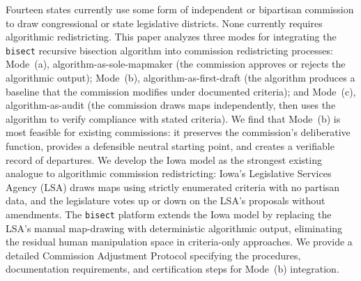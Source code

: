 Fourteen states currently use some form of independent or bipartisan commission to draw congressional or state legislative districts. None currently requires algorithmic redistricting. This paper analyzes three modes for integrating the \texttt{bisect} recursive bisection algorithm into commission redistricting processes: Mode~(a), algorithm-as-sole-mapmaker (the commission approves or rejects the algorithmic output); Mode~(b), algorithm-as-first-draft (the algorithm produces a baseline that the commission modifies under documented criteria); and Mode~(c), algorithm-as-audit (the commission draws maps independently, then uses the algorithm to verify compliance with stated criteria). We find that Mode~(b) is most feasible for existing commissions: it preserves the commission's deliberative function, provides a defensible neutral starting point, and creates a verifiable record of departures. We develop the Iowa model as the strongest existing analogue to algorithmic commission redistricting: Iowa's Legislative Services Agency (LSA) draws maps using strictly enumerated criteria with no partisan data, and the legislature votes up or down on the LSA's proposals without amendments. The \texttt{bisect} platform extends the Iowa model by replacing the LSA's manual map-drawing with deterministic algorithmic output, eliminating the residual human manipulation space in criteria-only approaches. We provide a detailed Commission Adjustment Protocol specifying the procedures, documentation requirements, and certification steps for Mode~(b) integration.
